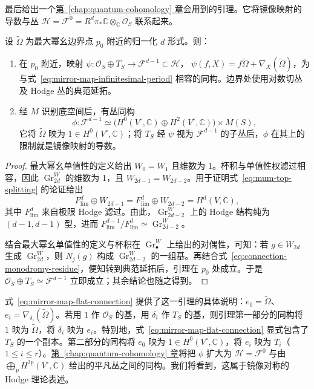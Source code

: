 最后给出一个\hyperref[chap:quantum-cohomology]{第~\ref*{chap:quantum-cohomology} 章}会用到的引理。它将镜像映射的导数与丛 $\mathcal H=\mathcal F^0=R^d\pi_*\mathbb C\otimes_{\mathbb C}\mathcal O_S$ 联系起来。

\begin{lemma}\label{lem:mirror-map-hodge-splitting}
设 $\widetilde\Omega$ 为最大幂幺边界点 $p_0$ 附近的归一化 $d$ 形式。则：
\begin{enumerate}[label=(\roman*)]
\item 在 $p_0$ 附近，映射
$\psi:\mathcal O_S\oplus T_S\to\mathcal F^{d-1}\subset\mathcal H$，
$\psi(f,X)=f\widetilde\Omega+\nabla_X(\widetilde\Omega)$，为与式~\eqref{eq:mirror-map-infinitesimal-period} 相容的同构。边界处使用对数切丛及 Hodge 丛的典范延拓。
\item 经 $M$ 识别底空间后，有丛同构
\[
\phi:\mathcal F^{d-1}\simeq
\bigl(H^0(V^\circ,\mathbb C)\oplus H^2(V^\circ,\mathbb C)\bigr)\times M(S),
\]
它将 $\widetilde\Omega$ 映为 $1\in H^0(V^\circ,\mathbb C)$；将 $T_S$ 经 $\psi$ 视为 $\mathcal F^{d-1}$ 的子丛后，$\phi$ 在其上的限制就是镜像映射的导数。
\end{enumerate}
\end{lemma}
\begin{proof}
最大幂幺单值性的定义给出 $W_0=W_1$ 且维数为 1。杯积与单值性权滤过相容，因此 $\operatorname{Gr}^W_{2d}$ 的维数为 1，且 $W_{2d-1}=W_{2d-2}$。用于证明式~\eqref{eq:mum-top-splitting} 的论证给出
\[
F^d_{\mathrm{lim}}\oplus W_{2d-1}
=F^d_{\mathrm{lim}}\oplus W_{2d-2}=H^d(V,\mathbb C),
\]
其中 $F^d_{\mathrm{lim}}$ 来自极限 Hodge 滤过。由此，$\operatorname{Gr}^W_{2d-2}$ 上的 Hodge 结构纯为 $(d-1,d-1)$ 型，进而
$F^{d-1}_{\mathrm{lim}}/F^d_{\mathrm{lim}}\simeq\operatorname{Gr}^W_{2d-2}$。

结合最大幂幺单值性的定义与杯积在 $\operatorname{Gr}^W_\bullet$ 上给出的对偶性，可知：若 $g\in W_{2d}$ 生成 $\operatorname{Gr}^W_{2d}$，则 $N_j(g)$ 构成 $\operatorname{Gr}^W_{2d-2}$ 的一组基。再结合式~\eqref{eq:connection-monodromy-residue}，便知转到典范延拓后，引理在 $p_0$ 处成立。于是 $\mathcal O_S\oplus T_S\simeq\mathcal F^{d-1}$ 立即成立；其余结论也随之得到。
\end{proof}

式~\eqref{eq:mirror-map-flat-connection} 提供了这一引理的具体说明：$e_0=\widetilde\Omega$、$e_i=\nabla_{\delta_i}(\widetilde\Omega)$。若用 $1$ 作 $\mathcal O_S$ 的基，用 $\delta_i$ 作 $T_S$ 的基，则引理第一部分的同构将 $1$ 映为 $\widetilde\Omega$，将 $\delta_i$ 映为 $e_i$。特别地，式~\eqref{eq:mirror-map-flat-connection} 显式包含了 $T_S$ 的一个副本。第二部分的同构将 $e_0$ 映为 $1\in H^0(V^\circ,\mathbb C)$，将 $e_i$ 映为 $T_i$（$1\leq i\leq r$）。\hyperref[chap:quantum-cohomology]{第~\ref*{chap:quantum-cohomology} 章}将把 $\phi$ 扩大为 $\mathcal H=\mathcal F^0$ 与由 $\bigoplus_pH^{2p}(V^\circ,\mathbb C)$ 给出的平凡丛之间的同构。我们将看到，这属于镜像对称的 Hodge 理论表述。

